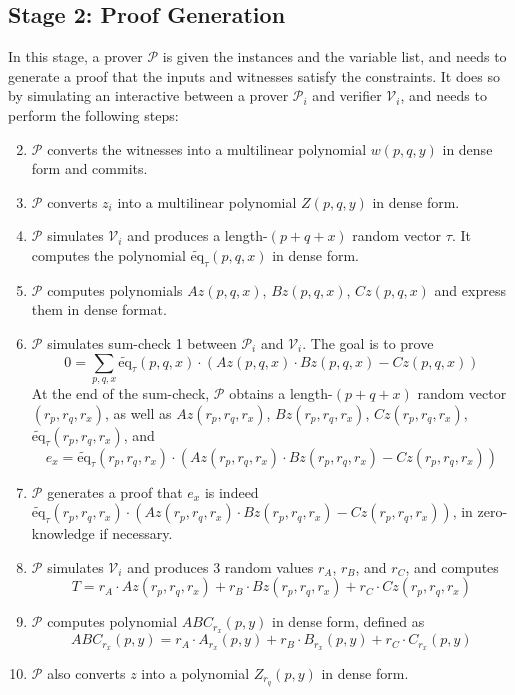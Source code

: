 \documentclass{article}
\renewcommand{\P}{\mathcal{P}}
\newcommand{\V}{\mathcal{V}}
\newcommand{\eq}{\widetilde{\mbox{eq}}}
\begin{document}
\subsection{Stage 2: Proof Generation}\label{stage:prover}
In this stage, a prover $\P$ is given the instances and the variable list, and needs to generate a proof that the inputs and witnesses satisfy the constraints. It does so by simulating an interactive between a prover $\P_i$ and verifier $\V_i$, and needs to perform the following steps:
\begin{enumerate}
    \setcounter{enumi}{1}
    \item $\P$ converts the witnesses into a multilinear polynomial $w(p, q, y)$ in dense form and commits.\label{step:witness-commit}
    \item $\P$ converts $z_i$ into a multilinear polynomial $Z(p, q, y)$ in dense form.
    \item $\P$ simulates $\V_i$ and produces a length-$(p + q + x)$ random vector $\tau$. It computes the polynomial $\eq_{\tau}(p, q, x)$ in dense form.\label{step:produce-eq-tau}
    \item $\P$ computes polynomials $Az(p, q, x)$, $Bz(p, q, x)$, $Cz(p, q, x)$ and express them in dense format.\label{step:mat-product}
    \item $\P$ simulates sum-check 1 between $\P_i$ and $\V_i$. The goal is to prove
    $$\displaystyle0 =\sum_{p, q, x} \eq_\tau(p, q, x)\cdot (Az(p, q, x)\cdot Bz(p, q, x) - Cz(p, q, x))$$
    At the end of the sum-check, $\P$ obtains a length-$(p + q + x)$ random vector $(r_p, r_q, r_x)$, as well as $Az(r_p, r_q, r_x)$, $Bz(r_p, r_q, r_x)$, $Cz(r_p, r_q, r_x)$, $\eq_\tau(r_p, r_q, r_x)$, and
    $$e_x = \eq_\tau(r_p, r_q, r_x)\cdot (Az(r_p, r_q, r_x)\cdot Bz(r_p, r_q, r_x) - Cz(r_p, r_q, r_x))$$\label{step:sumcheck-1}
    \item $\P$ generates a proof that $e_x$ is indeed $\eq_\tau(r_p, r_q, r_x)\cdot (Az(r_p, r_q, r_x)\cdot Bz(r_p, r_q, r_x) - Cz(r_p, r_q, r_x))$, in zero-knowledge if necessary.\label{step:p_proof_1}
    \item $\P$ simulates $\V_i$ and produces 3 random values $r_A$, $r_B$, and $r_C$, and computes 
    $$T = r_A\cdot Az(r_p, r_q, r_x) + r_B\cdot Bz(r_p, r_q, r_x) + r_C\cdot Cz(r_p, r_q, r_x)$$
    \item $\P$ computes polynomial $ABC_{r_x}(p, y)$ in dense form, defined as
    $$ABC_{r_x}(p, y) = r_A\cdot A_{r_x}(p, y) + r_B\cdot B_{r_x}(p, y) + r_C\cdot C_{r_x}(p, y)$$
    \item $\P$ also converts $z$ into a polynomial $Z_{r_q}(p, y)$ in dense form.\label{step:compute-z-poly}

\end{enumerate}
\end{document}
